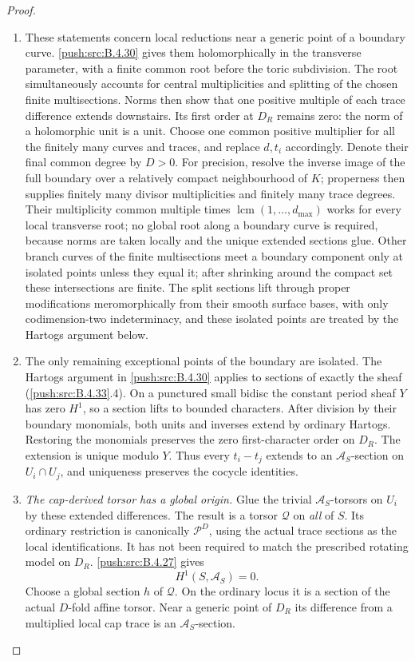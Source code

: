 \begin{proof}
\begin{enumerate}[label=\arabic*.,leftmargin=*]
\item These statements concern local reductions
near a generic point of a boundary curve.
\ref{push:src:B.4.30} gives them holomorphically in the
transverse parameter, with a finite
common root before the toric subdivision.
The root simultaneously accounts for
central multiplicities and splitting of
the chosen finite multisections. Norms
then show that one positive multiple of
each trace difference extends downstairs.
Its first order at $D_R$ remains zero:
the norm of a holomorphic unit is a unit.
Choose one common positive multiplier
for all the finitely many curves and
traces, and replace $d,t_i$ accordingly.
Denote their final common degree by $D>0$.
For precision, resolve the inverse image
of the full boundary over a relatively
compact neighbourhood of $K$; properness
then supplies finitely many divisor
multiplicities and finitely many trace
degrees. Their multiplicity common multiple
times $\operatorname{lcm}(1,\ldots,d_{\max})$
works for every local transverse root;
no global root along a boundary curve
is required, because norms are taken
locally and the unique extended sections
glue. Other branch curves of the finite
multisections meet a boundary component
only at isolated points unless they
equal it; after shrinking around the
compact set these intersections are
finite. The split sections lift through
proper modifications meromorphically from
their smooth surface bases, with only
codimension-two indeterminacy, and these
isolated points are treated by the
Hartogs argument below.

\item The only remaining exceptional points of
the boundary are isolated. The Hartogs
argument in \ref{push:src:B.4.30} applies to sections
of exactly the sheaf (\ref{push:src:B.4.33}.4). On a
punctured small bidisc the constant
period sheaf $Y$ has zero $H^1$, so a
section lifts to bounded characters.
After division by their boundary monomials,
both units and inverses extend by ordinary
Hartogs. Restoring the monomials preserves
the zero first-character order on $D_R$.
The extension is unique modulo $Y$.
Thus every $t_i-t_j$ extends to an
$\mathcal A_S$-section on $U_i\cap U_j$,
and uniqueness preserves the cocycle
identities.

\item \emph{The cap-derived torsor has a global origin.}
Glue the trivial $\mathcal A_S$-torsors
on $U_i$ by these extended differences.
The result is a torsor $\mathcal Q$ on
\emph{all} of $S$. Its ordinary restriction
is canonically $\mathscr P^D$, using
the actual trace sections as the local
identifications. It has not been required
to match the prescribed rotating model
on $D_R$. \ref{push:src:B.4.27} gives
\[
 H^1(S,\mathcal A_S)=0.
 \tag{B.4.33.6}
\]
Choose a global section $h$ of $\mathcal Q$.
On the ordinary locus it is a section
of the actual $D$-fold affine torsor.
Near a generic point of $D_R$ its
difference from a multiplied local cap
trace is an $\mathcal A_S$-section.


\end{enumerate}
\end{proof}
